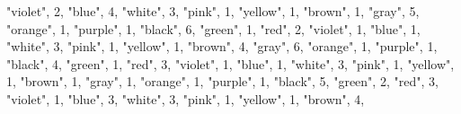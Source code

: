 \documentclass[
]{article}
\newenvironment{Shaded}{\begin{snugshade}}{\end{snugshade}}
\newcommand{\DecValTok}[1]{\textcolor[rgb]{0.00,0.00,0.81}{#1}}
\newcommand{\NormalTok}[1]{#1}
\newcommand{\StringTok}[1]{\textcolor[rgb]{0.31,0.60,0.02}{#1}}
\begin{document}
\begin{Shaded}
\begin{Highlighting}[]
  \StringTok{"violet"}\NormalTok{, }\DecValTok{2}\NormalTok{,}
  \StringTok{"blue"}\NormalTok{, }\DecValTok{4}\NormalTok{,}
  \StringTok{"white"}\NormalTok{, }\DecValTok{3}\NormalTok{,}
  \StringTok{"pink"}\NormalTok{, }\DecValTok{1}\NormalTok{,}
  \StringTok{"yellow"}\NormalTok{, }\DecValTok{1}\NormalTok{,}
  \StringTok{"brown"}\NormalTok{, }\DecValTok{1}\NormalTok{,}
  \StringTok{"gray"}\NormalTok{, }\DecValTok{5}\NormalTok{,}
  \StringTok{"orange"}\NormalTok{, }\DecValTok{1}\NormalTok{,}
  \StringTok{"purple"}\NormalTok{, }\DecValTok{1}\NormalTok{,}
    \StringTok{"black"}\NormalTok{, }\DecValTok{6}\NormalTok{,}
  \StringTok{"green"}\NormalTok{, }\DecValTok{1}\NormalTok{,}
  \StringTok{"red"}\NormalTok{, }\DecValTok{2}\NormalTok{,}
  \StringTok{"violet"}\NormalTok{, }\DecValTok{1}\NormalTok{,}
  \StringTok{"blue"}\NormalTok{, }\DecValTok{1}\NormalTok{,}
  \StringTok{"white"}\NormalTok{, }\DecValTok{3}\NormalTok{,}
  \StringTok{"pink"}\NormalTok{, }\DecValTok{1}\NormalTok{,}
  \StringTok{"yellow"}\NormalTok{, }\DecValTok{1}\NormalTok{,}
  \StringTok{"brown"}\NormalTok{, }\DecValTok{4}\NormalTok{,}
  \StringTok{"gray"}\NormalTok{, }\DecValTok{6}\NormalTok{,}
  \StringTok{"orange"}\NormalTok{, }\DecValTok{1}\NormalTok{,}
  \StringTok{"purple"}\NormalTok{, }\DecValTok{1}\NormalTok{,}
    \StringTok{"black"}\NormalTok{, }\DecValTok{4}\NormalTok{,}
  \StringTok{"green"}\NormalTok{, }\DecValTok{1}\NormalTok{,}
  \StringTok{"red"}\NormalTok{, }\DecValTok{3}\NormalTok{,}
  \StringTok{"violet"}\NormalTok{, }\DecValTok{1}\NormalTok{,}
  \StringTok{"blue"}\NormalTok{, }\DecValTok{1}\NormalTok{,}
  \StringTok{"white"}\NormalTok{, }\DecValTok{3}\NormalTok{,}
  \StringTok{"pink"}\NormalTok{, }\DecValTok{1}\NormalTok{,}
  \StringTok{"yellow"}\NormalTok{, }\DecValTok{1}\NormalTok{,}
  \StringTok{"brown"}\NormalTok{, }\DecValTok{1}\NormalTok{,}
  \StringTok{"gray"}\NormalTok{, }\DecValTok{1}\NormalTok{,}
  \StringTok{"orange"}\NormalTok{, }\DecValTok{1}\NormalTok{,}
  \StringTok{"purple"}\NormalTok{, }\DecValTok{1}\NormalTok{,}
    \StringTok{"black"}\NormalTok{, }\DecValTok{5}\NormalTok{,}
  \StringTok{"green"}\NormalTok{, }\DecValTok{2}\NormalTok{,}
  \StringTok{"red"}\NormalTok{, }\DecValTok{3}\NormalTok{,}
  \StringTok{"violet"}\NormalTok{, }\DecValTok{1}\NormalTok{,}
  \StringTok{"blue"}\NormalTok{, }\DecValTok{3}\NormalTok{,}
  \StringTok{"white"}\NormalTok{, }\DecValTok{3}\NormalTok{,}
  \StringTok{"pink"}\NormalTok{, }\DecValTok{1}\NormalTok{,}
  \StringTok{"yellow"}\NormalTok{, }\DecValTok{1}\NormalTok{,}
  \StringTok{"brown"}\NormalTok{, }\DecValTok{4}\NormalTok{,}

\end{Highlighting}
\end{Shaded}
\end{document}
